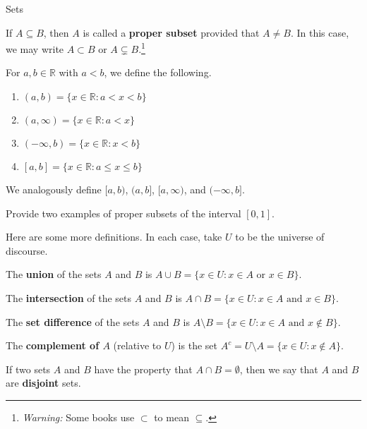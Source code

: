 \begin{section}{Sets}
\begin{definition}
If $A\subseteq B$, then $A$ is called a \textbf{proper subset} provided that $A\neq B$.  In this case, we may write $A\subset B$ or $A\subsetneq B$.\footnote{\emph{Warning:} Some books use $\subset$ to mean $\subseteq$.}
\end{definition}

\begin{definition}
For $a,b\in\mathbb{R}$ with $a<b$, we define the following.
\begin{enumerate}
\item $(a,b)=\{x\in\mathbb{R}:a<x<b\}$
\item $(a,\infty)=\{x\in\mathbb{R}:a<x\}$
\item $(-\infty,b)=\{x\in\mathbb{R}:x<b\}$
\item $[a,b]=\{x\in\mathbb{R}:a\leq x\leq b\}$
\end{enumerate}
We analogously define $[a,b)$, $(a,b]$, $[a,\infty)$, and $(-\infty,b]$.
\end{definition}

\begin{exercise}
Provide two examples of proper subsets of the interval $[0,1]$.
\end{exercise}

Here are some more definitions.  In each case, take $U$ to be the universe of discourse.

\begin{definition}
The \textbf{union} of the sets $A$ and $B$ is $A \cup B =\{x\in U : x\in A \mbox{ or } x\in B \}$.
\end{definition}

\begin{definition}
The \textbf{intersection} of the sets $A$ and $B$ is $A \cap B =\{x\in U : x\in A \mbox{ and } x\in B \}$.
\end{definition}

\begin{definition}
The \textbf{set difference} of the sets $A$ and $B$ is $A \setminus B =\{x\in U : x\in A \mbox{ and } x\notin B \}$.
\end{definition}

\begin{definition}
The \textbf{complement of $A$} (relative to $U$) is the set $A^c=U \setminus A =\{x \in U : x \notin A\}$.
\end{definition}

\begin{definition}
If two sets $A$ and $B$ have the property that $A \cap B = \emptyset$, then we say that $A$ and $B$ are \textbf{disjoint} sets.
\end{definition}


\end{section}
